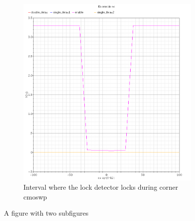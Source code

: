 \documentclass[a4paper,12pt]{article} \usepackage{graphicx}
\begin{document}
\begin{figure}
\begin{subfigure}[b]{.3\textwidth}
        \centering
        \includegraphics[width=\textwidth]{../Bilder/LD_tran/PD_wp.png}
        \caption{Interval where the lock detector locks during corner cmoswp}
        \label{fig:LD_wp}
\end{subfigure}
\caption{A figure with two subfigures}
\label{fig:test}
\end{figure}
\end{document}
